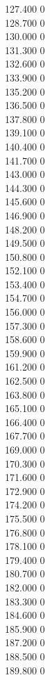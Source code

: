 { 127.400	0 \\
 128.700	0 \\
 130.000	0 \\
 131.300	0 \\
 132.600	0 \\
 133.900	0 \\
 135.200	0 \\
 136.500	0 \\
 137.800	0 \\
 139.100	0 \\
 140.400	0 \\
 141.700	0 \\
 143.000	0 \\
 144.300	0 \\
 145.600	0 \\
 146.900	0 \\
 148.200	0 \\
 149.500	0 \\
 150.800	0 \\
 152.100	0 \\
 153.400	0 \\
 154.700	0 \\
 156.000	0 \\
 157.300	0 \\
 158.600	0 \\
 159.900	0 \\
 161.200	0 \\
 162.500	0 \\
 163.800	0 \\
 165.100	0 \\
 166.400	0 \\
 167.700	0 \\
 169.000	0 \\
 170.300	0 \\
 171.600	0 \\
 172.900	0 \\
 174.200	0 \\
 175.500	0 \\
 176.800	0 \\
 178.100	0 \\
 179.400	0 \\
 180.700	0 \\
 182.000	0 \\
 183.300	0 \\
 184.600	0 \\
 185.900	0 \\
 187.200	0 \\
 188.500	0 \\
 189.800	0 \\
}
